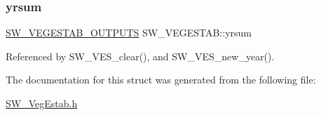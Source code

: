 \subsubsection{\texorpdfstring{yrsum}{yrsum}}
{\footnotesize\ttfamily \hyperlink{struct_s_w___v_e_g_e_s_t_a_b___o_u_t_p_u_t_s}{S\+W\+\_\+\+V\+E\+G\+E\+S\+T\+A\+B\+\_\+\+O\+U\+T\+P\+U\+TS} S\+W\+\_\+\+V\+E\+G\+E\+S\+T\+A\+B\+::yrsum}



Referenced by S\+W\+\_\+\+V\+E\+S\+\_\+clear(), and S\+W\+\_\+\+V\+E\+S\+\_\+new\+\_\+year().



The documentation for this struct was generated from the following file\+:\begin{DoxyCompactItemize}
\item 
\hyperlink{_s_w___veg_estab_8h}{S\+W\+\_\+\+Veg\+Estab.\+h}\end{DoxyCompactItemize}
